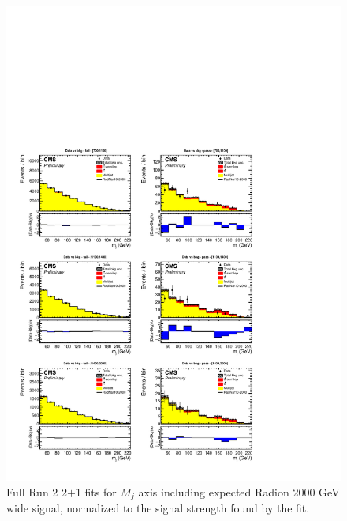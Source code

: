 \begin{figure}[!htb]
	\centering
	\includegraphics[width=1\textwidth]{Figures/postfit_projx_fits_21wide.pdf}
	\caption{Full Run 2 2$+$1 fits for $M_j$ axis including expected Radion 2000 GeV wide signal, normalized to the signal strength found by the fit.}
	\label{fig:21mjwide}
\end{figure}
